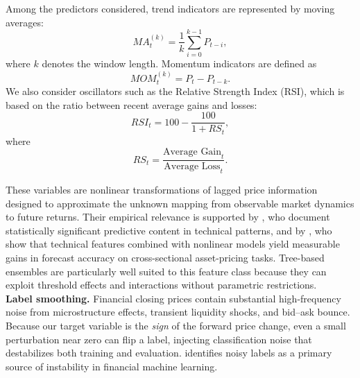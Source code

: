 \documentclass{rQUF2e}
\begin{document}
\noindent Among the predictors considered, trend indicators are represented by moving averages:
\begin{equation}
MA_t^{(k)} = \frac{1}{k}\sum_{i=0}^{k-1} P_{t-i},
\end{equation}
where \(k\) denotes the window length. Momentum indicators are defined as
\begin{equation}
MOM_t^{(k)} = P_t - P_{t-k}.
\end{equation}
We also consider oscillators such as the Relative Strength Index (RSI), which is based on the ratio between recent average gains and losses:
\begin{equation}
RSI_t = 100 - \frac{100}{1 + RS_t},
\end{equation}
where
\begin{equation}
RS_t = \frac{\text{Average Gain}_t}{\text{Average Loss}_t}.
\end{equation}

\noindent These variables are nonlinear transformations of lagged price information designed to approximate the unknown mapping from observable market dynamics to future returns. Their empirical relevance is supported by \citet{lo2000foundations}, who document statistically significant predictive content in technical patterns, and by \citet{gu2020empirical}, who show that technical features combined with nonlinear models yield measurable gains in forecast accuracy on cross-sectional asset-pricing tasks. Tree-based ensembles are particularly well suited to this feature class because they can exploit threshold effects and interactions without parametric restrictions. \\

\noindent \textbf{Label smoothing.} Financial closing prices contain substantial high-frequency noise from microstructure effects, transient liquidity shocks, and bid--ask bounce. Because our target variable is the \emph{sign} of the forward price change, even a small perturbation near zero can flip a label, injecting classification noise that destabilizes both training and evaluation. \citet{lopez2018advances} identifies noisy labels as a primary source of instability in financial machine learning. \\
\end{document}
